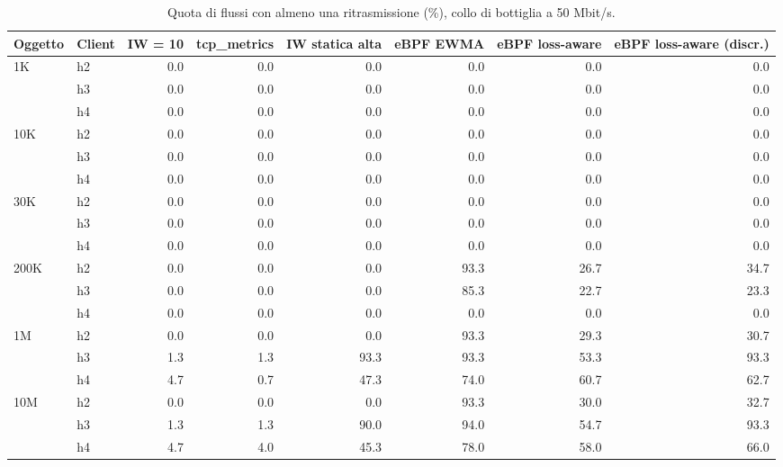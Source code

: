 \begin{table}[htbp]
  \centering
  \caption{Quota di flussi con almeno una ritrasmissione (\%), collo di bottiglia a 50 Mbit/s.}
  \label{tab:retransflow-50}
  \begin{tabular}{llrrrrrr}
    \toprule
    Oggetto & Client & IW = 10 & tcp\_metrics & IW statica alta & eBPF EWMA & eBPF loss-aware & eBPF loss-aware (discr.) \\
    \midrule
    1K & h2 & 0.0 & 0.0 & 0.0 & 0.0 & 0.0 & 0.0 \\
     & h3 & 0.0 & 0.0 & 0.0 & 0.0 & 0.0 & 0.0 \\
     & h4 & 0.0 & 0.0 & 0.0 & 0.0 & 0.0 & 0.0 \\
    \addlinespace
    10K & h2 & 0.0 & 0.0 & 0.0 & 0.0 & 0.0 & 0.0 \\
     & h3 & 0.0 & 0.0 & 0.0 & 0.0 & 0.0 & 0.0 \\
     & h4 & 0.0 & 0.0 & 0.0 & 0.0 & 0.0 & 0.0 \\
    \addlinespace
    30K & h2 & 0.0 & 0.0 & 0.0 & 0.0 & 0.0 & 0.0 \\
     & h3 & 0.0 & 0.0 & 0.0 & 0.0 & 0.0 & 0.0 \\
     & h4 & 0.0 & 0.0 & 0.0 & 0.0 & 0.0 & 0.0 \\
    \addlinespace
    200K & h2 & 0.0 & 0.0 & 0.0 & 93.3 & 26.7 & 34.7 \\
     & h3 & 0.0 & 0.0 & 0.0 & 85.3 & 22.7 & 23.3 \\
     & h4 & 0.0 & 0.0 & 0.0 & 0.0 & 0.0 & 0.0 \\
    \addlinespace
    1M & h2 & 0.0 & 0.0 & 0.0 & 93.3 & 29.3 & 30.7 \\
     & h3 & 1.3 & 1.3 & 93.3 & 93.3 & 53.3 & 93.3 \\
     & h4 & 4.7 & 0.7 & 47.3 & 74.0 & 60.7 & 62.7 \\
    \addlinespace
    10M & h2 & 0.0 & 0.0 & 0.0 & 93.3 & 30.0 & 32.7 \\
     & h3 & 1.3 & 1.3 & 90.0 & 94.0 & 54.7 & 93.3 \\
     & h4 & 4.7 & 4.0 & 45.3 & 78.0 & 58.0 & 66.0 \\
    \bottomrule
  \end{tabular}
\end{table}
